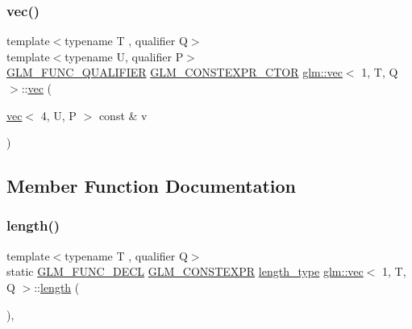 \mbox{\label{structglm_1_1vec_3_011_00_01_t_00_01_q_01_4_a488f936163dd6df03df27373e8337869}} 
\subsubsection{\texorpdfstring{vec()}{vec()}\hspace{0.1cm}{\footnotesize\ttfamily [14/14]}}
{\footnotesize\ttfamily template$<$typename T , qualifier Q$>$ \\
template$<$typename U, qualifier P$>$ \\
\hyperlink{setup_8hpp_a33fdea6f91c5f834105f7415e2a64407}{G\+L\+M\+\_\+\+F\+U\+N\+C\+\_\+\+Q\+U\+A\+L\+I\+F\+I\+ER} \hyperlink{setup_8hpp_ad34178a09666081abdb573c14d1f4a5a}{G\+L\+M\+\_\+\+C\+O\+N\+S\+T\+E\+X\+P\+R\+\_\+\+C\+T\+OR} \hyperlink{structglm_1_1vec}{glm\+::vec}$<$ 1, T, Q $>$\+::\hyperlink{structglm_1_1vec}{vec} (\begin{DoxyParamCaption}\item[{\hyperlink{structglm_1_1vec}{vec}$<$ 4, U, P $>$ const \&}]{v }\end{DoxyParamCaption})}



\subsection{Member Function Documentation}
\mbox{\label{structglm_1_1vec_3_011_00_01_t_00_01_q_01_4_a225b4ffa0391c3f0c64d1b43cf7a662d}} 
\subsubsection{\texorpdfstring{length()}{length()}}
{\footnotesize\ttfamily template$<$typename T , qualifier Q$>$ \\
static \hyperlink{setup_8hpp_ab2d052de21a70539923e9bcbf6e83a51}{G\+L\+M\+\_\+\+F\+U\+N\+C\+\_\+\+D\+E\+CL} \hyperlink{setup_8hpp_a08b807947b47031d3a511f03f89645ad}{G\+L\+M\+\_\+\+C\+O\+N\+S\+T\+E\+X\+PR} \hyperlink{structglm_1_1vec_3_011_00_01_t_00_01_q_01_4_a37415eee3b59cf93cdb752a2b30fe5e6}{length\+\_\+type} \hyperlink{structglm_1_1vec}{glm\+::vec}$<$ 1, T, Q $>$\+::\hyperlink{_s_d_l__opengl__glext_8h_ab9c919755bde3b34349e23a32b4e0fa7}{length} (\begin{DoxyParamCaption}{ }\end{DoxyParamCaption})\hspace{0.3cm}{\ttfamily [inline]}, {\ttfamily [static]}}

